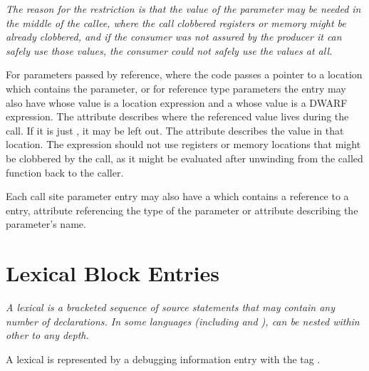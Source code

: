 \textit{The reason for the restriction is that the value of the parameter may be
needed in the middle of the callee, where the call clobbered registers or
memory might be already clobbered, and if the consumer was not assured by
the producer it can safely use those values, the consumer could not safely
use the values at all.}

For parameters passed by reference, where the code passes a pointer to
a location which contains the parameter, or for reference type parameters
the \DWTAGcallsiteparameter{} entry may also have 
\DWATcalldatalocationNAME{}
whose value is a location expression and a
\DWATcalldatavalueNAME{}
whose value is a DWARF expression.  The \DWATcalldatalocationDEFN{} attribute
describes where the referenced value lives during the call.  If it is just 
\DWOPpushobjectaddress{}, it may be left out.  The 
\DWATcalldatavalueNAME{} attribute
describes the value in that location. 
The expression should not use registers or memory
locations that might be clobbered by the call, as it might be evaluated after
unwinding from the called function back to the caller.

Each call site parameter entry may also have a 
\DWATcallparameterDEFN{}
which contains a reference to a \DWTAGformalparameter{} entry,
\DWATtype{} attribute referencing the type of the parameter or \DWATname{}
attribute describing the parameter's name.


\section{Lexical Block Entries}
\label{chap:lexicalblockentries}

\textit{A 
lexical  
is 
a bracketed sequence of source statements
that may contain any number of declarations. In some languages
(including  and ),
 can be nested within other
 to any depth.}

A lexical  is represented by a debugging information
entry with the 
tag \DWTAGlexicalblockTARG.

